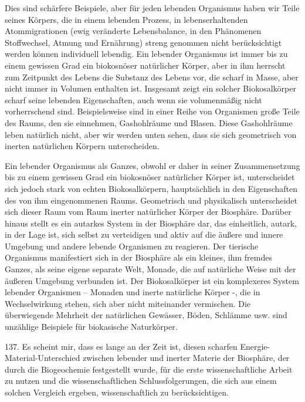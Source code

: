\documentclass[11pt,a4paper]{book}
\begin{document}
Dies sind schärfere Beispiele, aber für jeden lebenden Organismus haben wir Teile seines Körpers, die in einem lebenden Prozess, in lebenserhaltenden Atommigrationen (ewig veränderte Lebensbalance, in den Phänomenen Stoffwechsel, Atmung und Ernährung) streng genommen nicht berücksichtigt werden können individuell lebendig. Ein lebender Organismus ist immer bis zu einem gewissen Grad ein biokosnöser natürlicher Körper, aber in ihm herrscht zum Zeitpunkt des Lebens die Substanz des Lebens vor, die scharf in Masse, aber nicht immer in Volumen enthalten ist. Insgesamt zeigt ein solcher Biokosalkörper scharf seine lebenden Eigenschaften, auch wenn sie volumenmäßig nicht vorherrschend sind. Beispielsweise sind in einer Reihe von Organismen große Teile des Raums, den sie einnehmen, Gashohlräume und Blasen. Diese Gashohlräume leben natürlich nicht, aber wir werden unten sehen, dass sie sich geometrisch von inerten natürlichen Körpern unterscheiden.



Ein lebender Organismus als Ganzes, obwohl er daher in seiner Zusammensetzung bis zu einem gewissen Grad ein biokosnöser natürlicher Körper ist, unterscheidet sich jedoch stark von echten Biokosalkörpern, hauptsächlich in den Eigenschaften des von ihm eingenommenen Raums. Geometrisch und physikalisch unterscheidet sich dieser Raum vom Raum inerter natürlicher Körper der Biosphäre. Darüber hinaus stellt es ein autarkes System in der Biosphäre dar, das einheitlich, autark, in der Lage ist, sich selbst zu verteidigen und aktiv auf die äußere und innere Umgebung und andere lebende Organismen zu reagieren. Der tierische Organismus manifestiert sich in der Biosphäre als ein kleines, ihm fremdes Ganzes, als seine eigene separate Welt, Monade, die auf natürliche Weise mit der äußeren Umgebung verbunden ist. Der Biokosalkörper ist ein komplexeres System lebender Organismen -- Monaden und inerte natürliche Körper -, die in Wechselwirkung stehen, sich aber nicht miteinander vermischen. Die überwiegende Mehrheit der natürlichen Gewässer, Böden, Schlämme usw. sind unzählige Beispiele für biokasische Naturkörper.



137. Es scheint mir, dass es lange an der Zeit ist, diesen scharfen Energie-Material-Unterschied zwischen lebender und inerter Materie der Biosphäre, der durch die Biogeochemie festgestellt wurde, für die erste wissenschaftliche Arbeit zu nutzen und die wissenschaftlichen Schlussfolgerungen, die sich aus einem solchen Vergleich ergeben, wissenschaftlich zu berücksichtigen.
\end{document}
